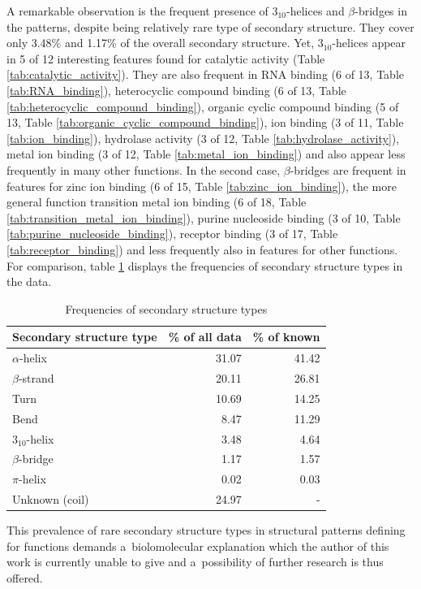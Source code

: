 \documentclass[11pt,twoside,a4paper]{book}
\begin{document}
A remarkable observation is the frequent presence of $3_{10}$-helices and $\beta$-bridges in the patterns,
despite being relatively rare type of secondary structure.
They cover only 3.48\% and 1.17\% of the overall secondary structure.
Yet, $3_{10}$-helices appear in 5 of 12 interesting features found for catalytic activity (Table \ref{tab:catalytic_activity}).
They are also frequent in
RNA binding (6 of 13, Table \ref{tab:RNA_binding}),
heterocyclic compound binding (6 of 13, Table \ref{tab:heterocyclic_compound_binding}),
organic cyclic compound binding (5 of 13, Table \ref{tab:organic_cyclic_compound_binding}),
ion binding (3 of 11, Table \ref{tab:ion_binding}),
hydrolase activity (3 of 12, Table \ref{tab:hydrolase_activity}),
metal ion binding (3 of 12, Table \ref{tab:metal_ion_binding}) 
and also appear less frequently in many other functions.
In the second case, $\beta$-bridges are frequent in features for 
zinc ion binding (6 of 15, Table \ref{tab:zinc_ion_binding}),
the more general function transition metal ion binding (6 of 18, Table \ref{tab:transition_metal_ion_binding}),
purine nucleoside binding (3 of 10, Table \ref{tab:purine_nucleoside_binding}),
receptor binding (3 of 17, Table \ref{tab:receptor_binding})
and less frequently also in features for other functions.
For comparison, table \ref{tab:secstr} displays the frequencies of secondary structure types in the data.
\begin{table}[h]\begin{center}\begin{tabular}{lrr}\textbf{Secondary structure type} & \textbf{\% of all data} & \textbf{\% of known} \\ \hline  
$\alpha$-helix & 31.07 & 41.42 \\ \hline
$\beta$-strand & 20.11 & 26.81 \\ \hline
Turn & 10.69 & 14.25 \\ \hline
Bend & 8.47 & 11.29 \\ \hline
$3_{10}$-helix & 3.48 & 4.64 \\ \hline
$\beta$-bridge & 1.17 & 1.57 \\ \hline
$\pi$-helix & 0.02 & 0.03 \\ \hline
Unknown (coil)  & 24.97 & - \\ \hline
\end{tabular}\end{center}\caption{Frequencies of secondary structure types}\label{tab:secstr}\end{table}
This prevalence of rare secondary structure types in 
structural patterns defining for functions
demands a~biolomolecular explanation
which the author of this work is currently unable to give
and a~possibility of further research is thus offered.
\end{document}
